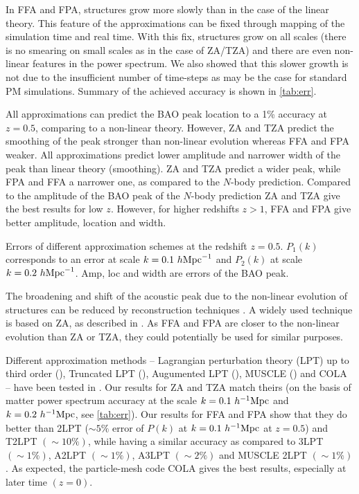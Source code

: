 In FFA and FPA, structures grow more slowly than in the case of the linear theory. This feature of the approximations can be fixed through mapping of the simulation time and real time. With this fix, structures grow on all scales (there is no smearing on small scales as in the case of ZA/TZA) and there are even non-linear features in the power spectrum. We also showed that this slower growth is not due to the insufficient number of time-steps as may be the case for standard PM simulations. Summary of the achieved accuracy is shown in \autoref{tab:err}.

All approximations can predict the BAO peak location to a 1\% accuracy at $z=0.5$, comparing to a non-linear theory. However, ZA and TZA predict the smoothing of the peak stronger than non-linear evolution \parencite[see, e.g.,][]{2007ApJ...664..660E, 2014JCAP...02..042S} whereas FFA and FPA weaker. All approximations predict lower amplitude and narrower width of the peak than linear theory (smoothing). ZA and TZA predict a wider peak, while FPA and FFA a narrower one, as compared to the $N$-body prediction. Compared to the amplitude of the BAO peak of the $N$-body prediction ZA and TZA give the best results for low $z$. However, for higher redshifts $z>1$, FFA and FPA give better amplitude, location and width.
\begin{table}
\centering

\caption
{Errors of different approximation schemes at the redshift $z=0.5$. $P_1(k)$ corresponds to an error at scale $k = 0.1~h\text{Mpc}^{-1}$ and $P_2(k)$ at scale $k = 0.2~h\text{Mpc}^{-1}$. Amp, loc and width are errors of the BAO peak.}
\label{tab:err}
\end{table}

The broadening and shift of the acoustic peak due to the non-linear evolution of structures can be reduced by reconstruction techniques \parencite{2007ApJ...664..675E}. A widely used technique is based on ZA, as described in \textcite{10.1111/j.1365-2966.2012.21888.x}. As FFA and FPA are closer to the non-linear evolution than ZA or TZA, they could potentially be used for similar purposes.

Different approximation methods -- Lagrangian perturbation theory (LPT) up to third order (\cite{10.1093/mnras/264.2.375}), Truncated LPT (\cite{1993MNRAS.260..765C}), Augumented LPT (\cite{10.1093/mnrasl/slt101}), MUSCLE (\cite{10.1093/mnrasl/slv141}) and COLA -- have been tested in \textcite{2017JCAP...07..050M}. Our results for ZA and TZA match theirs (on the basis of matter power spectrum accuracy at the scale $k=0.1~h^{-1}\text{Mpc}$ and $k=0.2~h^{-1}\text{Mpc}$, see \autoref{tab:err}). Our results for FFA and FPA show that they do better than 2LPT ($\sim5\%$ error of $P(k)$ at $k=0.1~h^{-1}\text{Mpc}$ at $z=0.5$) and T2LPT $(\sim10\%)$, while having a similar accuracy as compared to 3LPT $(\sim1\%)$, A2LPT $(\sim1\%)$, A3LPT $(\sim2\%)$ and MUSCLE 2LPT $(\sim1\%)$. As expected, the particle-mesh code COLA gives the best results, especially at later time $(z=0)$.

